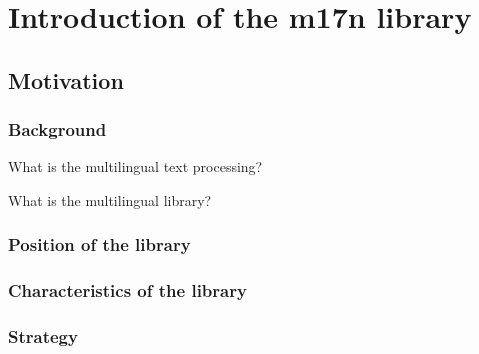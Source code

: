 \section{Introduction of the m17n library}

\subsection{Motivation}
\subsubsection{Background}

What is the multilingual text processing?

What is the multilingual library?

\subsubsection{Position of the library}

\subsubsection{Characteristics of the library}

\subsubsection{Strategy}

